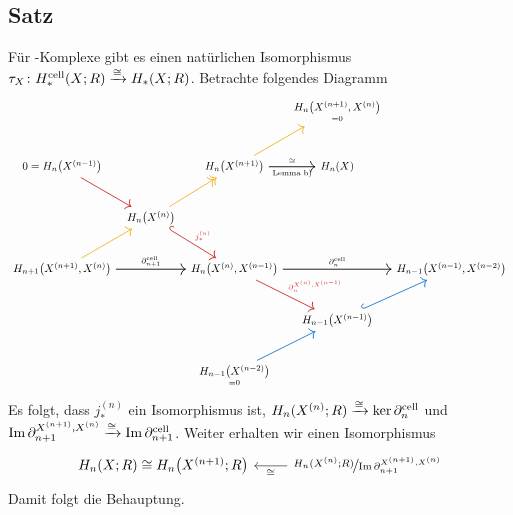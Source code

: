 \subsection{Satz} %
\label{sub:128}
Für \CW-Komplexe gibt es einen natürlichen Isomorphismus $\tau_X \colon H_*^{\operatorname{cell}}(X;R) \xrightarrow{\cong} H_*(X;R)$.
Betrachte folgendes Diagramm 
\[
	{\begin{tikzcd}[row sep=large, column sep=tiny, arrows=thick]
		& & & \underset{=0}{H_n \enbrace*{X^{(n+1)}, X^{(n)}}} \\ 
		0=H_n \enbrace*{X^{(n-1)}} \arrow[dr,Firebrick3] & & H_n \enbrace*{X^{(n+1)}} \rar["\cong", "\text{Lemma b)}"']  \arrow[ur, Goldenrod2] & H_n(X)\\  
		& H_n \enbrace*{X^{(n)}} \arrow[ur, two heads, Goldenrod2] \arrow[dr, hook, "j^{(n)}_*", Firebrick3]\\
		H_{n+1} \enbrace*{X^{(n+1)},X^{(n)}} \arrow[ur, Goldenrod2]\arrow[rr,"\partial_{n+1}^{\cell}"] 
		& & H_n \enbrace*{X^{(n)},X^{(n-1)}} \arrow[rr,"\partial_n^{\cell}"] \arrow[dr, "\partial_n^{X^{(n)},X^{(n-1)}}", Firebrick3]
		& & H_{n-1}  \enbrace*{X^{(n-1)},X^{(n-2)}}  \\
		& & & H_{n-1} \enbrace*{X^{(n-1)}} \arrow[ur, hook, DodgerBlue3] \\
		& & \underset{=0}{H_{n-1}\enbrace*{X^{(n-2)}} } \arrow[ur, DodgerBlue3]
	\end{tikzcd}}
\]
Es folgt, dass $j_*^{(n)}$ ein Isomorphismus ist, $H_n(X^{(n)};R) \xrightarrow{\cong} \ker \partial_n^{\operatorname{cell}}$ und $\operatorname{Im} \partial_{n+1}^{X^{(n+1)}, X^{(n)}} \xrightarrow{\cong} \operatorname{Im} \partial_{n+1}^{\operatorname{cell}}$. Weiter erhalten wir einen Isomorphismus
\[
	\begin{tikzcd}
		H_n(X;R) \cong H_n \enbrace*{X^{(n+1)};R} & \nicefrac{H_n(X^{(n)};R)}{ \im \partial_{n+1}^{X^{(n+1)}, X^{(n)}}} \lar["\cong"] 
	\end{tikzcd}
\]
Damit folgt die Behauptung. \bewende


